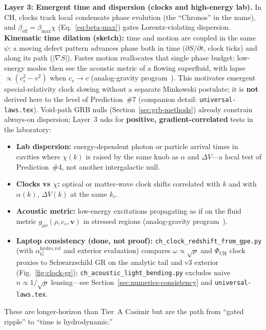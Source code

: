 \documentclass[11pt,a4paper]{article}
\begin{document}
\textbf{Layer 3: Emergent time and dispersion (clocks and high-energy lab).}
In CH, clocks track local condensate phase evolution (the ``Chronos'' in the name), and $\beta_{\mathrm{eff}} = \beta_{\max}\chi$ (Eq.~\ref{eq:beta-max}) gates Lorentz-violating dispersion.
\textbf{Kinematic time dilation (sketch):} time and motion are coupled in the same $\psi$: a moving defect pattern advances phase both in time ($\partial S/\partial t$, clock ticks) and along its path ($|\nabla S|$).
Faster motion reallocates that single phase budget; low-energy modes then see the acoustic metric of a flowing superfluid, with lapse $\propto (c_s^2 - v^2)$ when $c_s \to c$ (analog-gravity program~\cite{Unruh1981,Visser1995}).
This motivates emergent special-relativity clock slowing without a separate Minkowski postulate; it is \textbf{not} derived here to the level of Prediction~\#7 (companion detail: \texttt{universal-laws.tex}).
Void-path GRB nulls (Section~\ref{sec:grb-methods}) already constrain always-on dispersion; Layer~3 asks for \textbf{positive, gradient-correlated} tests in the laboratory:
\begin{itemize}[leftmargin=*]
  \item \textbf{Lab dispersion:} energy-dependent photon or particle arrival times in cavities where $\chi(k)$ is raised by the same knob as $\alpha$ and $\Delta V$---a local test of Prediction~\#4, not another intergalactic null.
  \item \textbf{Clocks vs $\chi$:} optical or matter-wave clock shifts correlated with $k$ and with $\alpha(k)$, $\Delta V(k)$ at the same $k_c$.
  \item \textbf{Acoustic metric:} low-energy excitations propagating as if on the fluid metric $g_{\mu\nu}(\rho, c_s, \mathbf{v})$ in stressed regions (analog-gravity program~\cite{Unruh1981,Visser1995}).
  \item \textbf{Laptop consistency (done, not proof):} \texttt{ch\_clock\_redshift\_from\_gpe.py} (with $\alpha_G^{\mathrm{hydro,ref}}$ and exterior evaluation) compares $\omega \propto \sqrt{\rho}$ and $\Phi_{\mathrm{CH}}$ clock proxies to Schwarzschild GR on the analytic tail and v3 exterior (Fig.~\ref{fig:clock-gr}); \texttt{ch\_acoustic\_light\_bending.py} excludes naive $n \propto 1/\sqrt{\rho}$ lensing---see Section~\ref{sec:numerics-consistency} and \texttt{universal-laws.tex}.
\end{itemize}
These are longer-horizon than Tier~A Casimir but are the path from ``gated ripple'' to ``time is hydrodynamic.''
\end{document}
